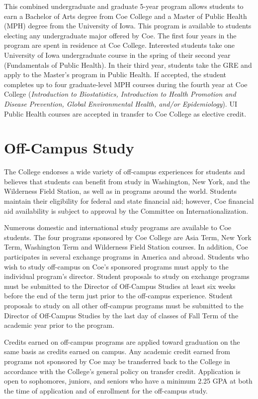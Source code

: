 \documentclass[
  letterpaper,
]{scrbook}
\begin{document}
This combined undergraduate and graduate 5-year program allows students
to earn a Bachelor of Arts degree from Coe College and a Master of
Public Health (MPH) degree from the University of Iowa. This program is
available to students electing any undergraduate major offered by Coe.
The first four years in the program are spent in residence at Coe
College. Interested students take one University of Iowa undergraduate
course in the spring of their second year (Fundamentals of Public
Health). In their third year, students take the GRE and apply to the
Master's program in Public Health. If accepted, the student completes up
to four graduate-level MPH courses during the fourth year at Coe College
(\emph{Introduction to Biostatistics, Introduction to Health Promotion
and Disease Prevention, Global Environmental Health, and/or
Epidemiology}). UI Public Health courses are accepted in transfer to Coe
College as elective credit.

\section{Off-Campus Study}\label{off-campus-study}

The College endorses a wide variety of off-campus experiences for
students and believes that students can benefit from study in
Washington, New York, and the Wilderness Field Station, as well as in
programs around the world. Students maintain their eligibility for
federal and state financial aid; however, Coe financial aid availability
is subject to approval by the Committee on Internationalization.

Numerous domestic and international study programs are available to Coe
students. The four programs sponsored by Coe College are Asia Term, New
York Term, Washington Term and Wilderness Field Station courses. In
addition, Coe participates in several exchange programs in America and
abroad. Students who wish to study off-campus on Coe's sponsored
programs must apply to the individual program's director. Student
proposals to study on exchange programs must be submitted to the
Director of Off-Campus Studies at least six weeks before the end of the
term just prior to the off-campus experience. Student proposals to study
on all other off-campus programs must be submitted to the Director of
Off-Campus Studies by the last day of classes of Fall Term of the
academic year prior to the program.

Credits earned on off-campus programs are applied toward graduation on
the same basis as credits earned on campus. Any academic credit earned
from programs not sponsored by Coe may be transferred back to the
College in accordance with the College's general policy on transfer
credit. Application is open to sophomores, juniors, and seniors who have
a minimum 2.25 GPA at both the time of application and of enrollment for
the off-campus study.
\end{document}
